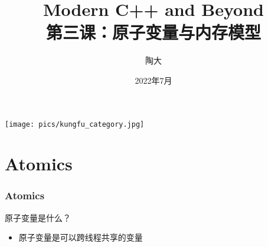 \documentclass[UTF8,lualatex]{ctexbeamer}
\title{\kaishu Modern C++ and Beyond\\
    第三课：原子变量与内存模型}
\author{陶大}
\date{2022年7月}
\begin{document}
\songti

\begin{frame}[plain]
    \titlepage
\end{frame}

\begin{frame}[plain]
    \begin{center}
        \texttt{[image: pics/kungfu\_category.jpg]}
    \end{center}
\end{frame}

\begin{frame}[plain]
    \tableofcontents
\end{frame}

\section{Atomics}

\begin{frame}
    \frametitle{Atomics}
    \begin{block}{原子变量是什么？}
        \begin{itemize}
            \item 原子变量是可以跨线程共享的变量
        \end{itemize}
    \end{block}
\end{frame}

\end{document}
